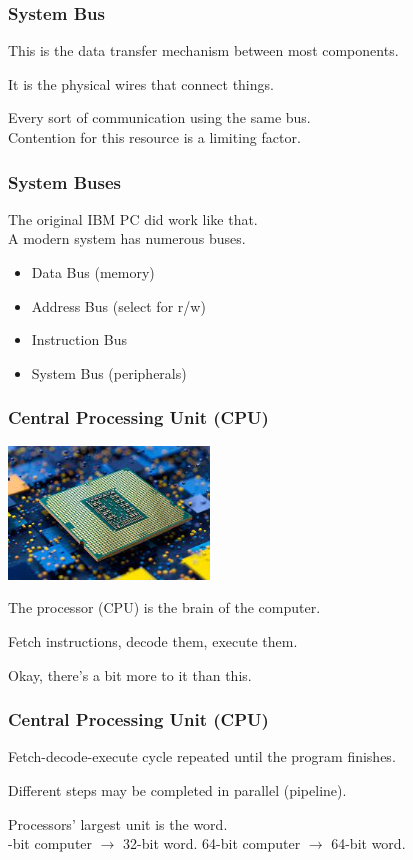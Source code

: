 \begin{frame}
\frametitle{System Bus}

This is the data transfer mechanism between most components.

It is the physical wires that connect things.

Every sort of communication using the same bus.\\
\quad Contention for this resource is a limiting factor. 

\end{frame}


\begin{frame}
\frametitle{System Buses}

The original IBM PC did work like that.\\
\quad A modern system has numerous buses.

\begin{itemize}
	\item Data Bus (memory)
	\item Address Bus (select for r/w)
	\item Instruction Bus
	\item System Bus (peripherals)
\end{itemize}

\end{frame}

\begin{frame}
\frametitle{Central Processing Unit (CPU)}

\begin{center}
	\includegraphics[width=0.4\textwidth]{images/cpu.jpg}
\end{center}


The processor (CPU) is the brain of the computer.

Fetch instructions, decode them, execute them.

Okay, there's a bit more to it than this.

\end{frame}

\begin{frame}
\frametitle{Central Processing Unit (CPU)}

Fetch-decode-execute cycle repeated until the program finishes.

Different steps may be completed in parallel (\alert{pipeline}).

Processors' largest unit is the \alert{word}.\\
-bit computer $\rightarrow$ 32-bit word. 64-bit computer $\rightarrow$ 64-bit word.

\end{frame}

